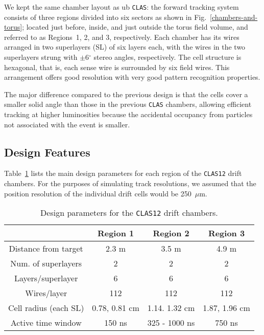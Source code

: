 We kept the same chamber layout as ub {\tt CLAS}:
the forward tracking system consists of three regions divided into six
sectors as shown in Fig.~\ref{chambers-and-torus}; located just before, inside, 
and just outside the torus field volume, and referred to as Regions~1, 2, 
and 3, respectively.  
Each chamber has its wires arranged in two superlayers (SL) of
six layers each, with the wires in the two superlayers strung with 
$\pm$6$^\circ$ stereo angles, respectively.  The cell structure is 
hexagonal, that is, each sense wire is surrounded by six field wires.  This 
arrangement offers good 
resolution with very good pattern recognition properties.  

The major difference compared to the previous design is that the 
cells cover a smaller solid angle than those in the previous {\tt CLAS} 
chambers, allowing efficient tracking at higher luminosities because the 
accidental occupancy from particles not associated with the event is smaller.  

\subsection{Design Features}

Table~\ref{fwd-dc-design-parms} lists the main design parameters for each 
region of the {\tt CLAS12} drift chambers.  For the purposes of simulating 
track resolutions, we assumed that the position resolution of the individual 
drift cells would be 250~$\mu$m.  

\small{
\begin{table}[ht]
\begin{center}
\begin{tabular}{||c|c|c|c||} \hline \hline
            &{\bf Region 1}&{\bf Region 2}&{\bf Region 3}\\ \hline
Distance from target & 2.3 m    & 3.5 m        & 4.9 m    \\ \hline
Num. of superlayers  & 2        & 2            & 2        \\ \hline
Layers/superlayer    & 6        & 6            & 6        \\ \hline
Wires/layer          & 112      & 112          & 112      \\ \hline
Cell radius (each SL) & 0.78, 0.81 cm  & 1.14. 1.32 cm      & 1.87, 1.96 cm  \\ \hline
Active time window   & 150 ns   & 325 - 1000 ns & 750 ns   \\ \hline
\end{tabular}
\caption{\small{Design parameters for the {\tt CLAS12} drift chambers.}}
\label{fwd-dc-design-parms}
\end{center}
\end{table}
}

